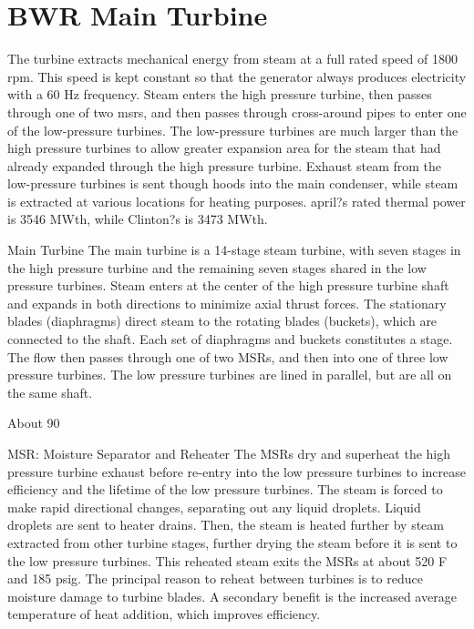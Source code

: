 \documentclass[10pt]{article}
\begin{document}
\tableofcontents
\clearpage

\section{BWR Main Turbine}

The turbine extracts mechanical energy from steam at a full rated speed of 1800 rpm. This speed is kept constant so that the generator always produces electricity with a 60 Hz frequency. Steam enters the high pressure turbine, then passes through one of two \gls{msr}s, and then passes through cross-around pipes to enter one of the low-pressure turbines. The low-pressure turbines are much larger than the high pressure turbines to allow greater expansion area for the steam that had already expanded through the high pressure turbine. Exhaust steam from the low-pressure turbines is sent though hoods into the main condenser, while steam is extracted at various locations for heating purposes. april?s rated thermal power is 3546 MWth, while Clinton?s is 3473 MWth.

Main Turbine
The main turbine is a 14-stage steam turbine, with seven stages in the high pressure turbine and the remaining seven stages shared in the low pressure turbines. Steam enters at the center of the high pressure turbine shaft and expands in both directions to minimize axial thrust forces. The stationary blades (diaphragms) direct steam to the rotating blades (buckets), which are connected to the shaft. Each set of diaphragms and buckets constitutes a stage. The flow then passes through one of two MSRs, and then into one of three low pressure turbines. The low pressure turbines are lined in parallel, but are all on the same shaft. 

About 90%

MSR: Moisture Separator and Reheater
The MSRs dry and superheat the high pressure turbine exhaust before re-entry into the low pressure turbines to increase efficiency and the lifetime of the low pressure turbines. The steam is forced to make rapid directional changes, separating out any liquid droplets. Liquid droplets are sent to heater drains. Then, the steam is heated further by steam extracted from other turbine stages, further drying the steam before it is sent to the low pressure turbines. This reheated steam exits the MSRs at about 520 F and 185 psig. The principal reason to reheat between turbines is to reduce moisture damage to turbine blades. A secondary benefit is the increased average temperature of heat addition, which improves efficiency. 
\end{document}
